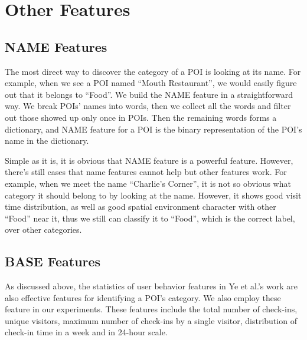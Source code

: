 \section{Other Features}
\label{chp:others}
\subsection{NAME Features}
The most direct way to discover the category of a POI is looking at its name.
For example, when we see a POI named ``Mouth Restaurant'', we would easily figure out that it belongs to ``Food''.
We build the NAME feature in a straightforward way. We break POIs' names into words,
then we collect all the words and filter out those showed up only once in POIs.
Then the remaining words forms a dictionary, and NAME feature for a POI is the
binary representation of the POI's name in the dictionary.

Simple as it is, it is obvious that NAME feature is a powerful feature.
However, there's still cases that name features cannot help but other features work.
For example, when we meet the name ``Charlie's Corner'', it is not so obvious what category
it should belong to by looking at the name. However, it shows good visit time distribution,
as well as good spatial environment character with other ``Food'' near it,
thus we still can classify it to ``Food'', which is the correct label, over other categories.

\subsection{BASE Features}
\label{sec:base}
As discussed above, the statistics of user behavior
features in Ye et al.'s work \cite{yemao} are also effective features for identifying
a POI's category. We also employ these feature in our experiments.
These features include the total number of check-ins, unique visitors,
maximum number of check-ins by a single visitor, distribution of check-in
time in a week and in 24-hour scale. %


